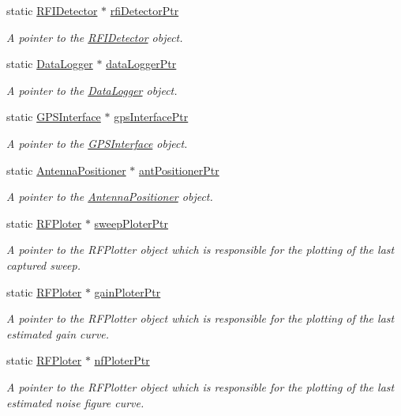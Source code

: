 \begin{DoxyCompactItemize}
static \hyperlink{classRFIDetector}{R\+F\+I\+Detector} $\ast$ \hyperlink{classSignalHandler_a9ce3533694e1e412496dc5a9b339ccc3}{rfi\+Detector\+Ptr}
\begin{DoxyCompactList}\small\item\em A pointer to the {\itshape \hyperlink{classRFIDetector}{R\+F\+I\+Detector}} object. \end{DoxyCompactList}\item 
static \hyperlink{classDataLogger}{Data\+Logger} $\ast$ \hyperlink{classSignalHandler_a114e600bdc2ad95efbc2991c97f3732c}{data\+Logger\+Ptr}
\begin{DoxyCompactList}\small\item\em A pointer to the {\itshape \hyperlink{classDataLogger}{Data\+Logger}} object. \end{DoxyCompactList}\item 
static \hyperlink{classGPSInterface}{G\+P\+S\+Interface} $\ast$ \hyperlink{classSignalHandler_ac6bc3decceefdff9d3e5c15e4125fe08}{gps\+Interface\+Ptr}
\begin{DoxyCompactList}\small\item\em A pointer to the {\itshape \hyperlink{classGPSInterface}{G\+P\+S\+Interface}} object. \end{DoxyCompactList}\item 
static \hyperlink{classAntennaPositioner}{Antenna\+Positioner} $\ast$ \hyperlink{classSignalHandler_a04f82481d0f5795308e6e2cef7bb0f88}{ant\+Positioner\+Ptr}
\begin{DoxyCompactList}\small\item\em A pointer to the {\itshape \hyperlink{classAntennaPositioner}{Antenna\+Positioner}} object. \end{DoxyCompactList}\item 
static \hyperlink{classRFPloter}{R\+F\+Ploter} $\ast$ \hyperlink{classSignalHandler_a15d34535b8684c5988ff1af1bf6062f6}{sweep\+Ploter\+Ptr}
\begin{DoxyCompactList}\small\item\em A pointer to the {\itshape R\+F\+Plotter} object which is responsible for the plotting of the last captured sweep. \end{DoxyCompactList}\item 
static \hyperlink{classRFPloter}{R\+F\+Ploter} $\ast$ \hyperlink{classSignalHandler_a1c6637986751faafe7cb5ffd58400f77}{gain\+Ploter\+Ptr}
\begin{DoxyCompactList}\small\item\em A pointer to the {\itshape R\+F\+Plotter} object which is responsible for the plotting of the last estimated gain curve. \end{DoxyCompactList}\item 
static \hyperlink{classRFPloter}{R\+F\+Ploter} $\ast$ \hyperlink{classSignalHandler_ada606b8ef692809838f1e5464871742c}{nf\+Ploter\+Ptr}
\begin{DoxyCompactList}\small\item\em A pointer to the {\itshape R\+F\+Plotter} object which is responsible for the plotting of the last estimated noise figure curve. \end{DoxyCompactList}\end{DoxyCompactItemize}


